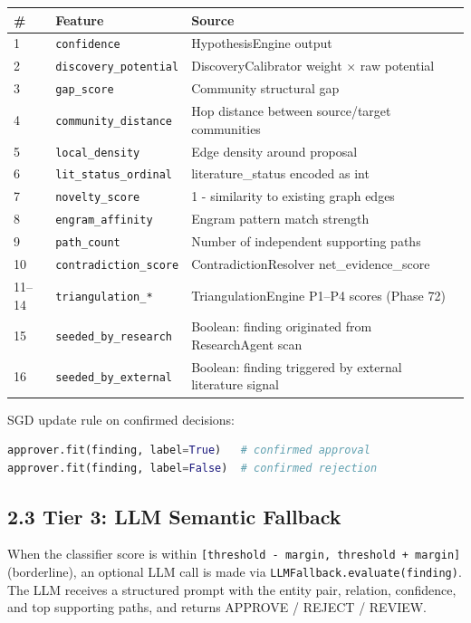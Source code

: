 \begin{table}[h]
\small\centering
\begin{tabular}{lll}
\toprule
# & Feature & Source \\
\midrule
1 & \texttt{confidence} & HypothesisEngine output \\
2 & \texttt{discovery\_potential} & DiscoveryCalibrator weight $\times$ raw potential \\
3 & \texttt{gap\_score} & Community structural gap \\
4 & \texttt{community\_distance} & Hop distance between source/target communities \\
5 & \texttt{local\_density} & Edge density around proposal \\
6 & \texttt{lit\_status\_ordinal} & literature_status encoded as int \\
7 & \texttt{novelty\_score} & 1 - similarity to existing graph edges \\
8 & \texttt{engram\_affinity} & Engram pattern match strength \\
9 & \texttt{path\_count} & Number of independent supporting paths \\
10 & \texttt{contradiction\_score} & ContradictionResolver net_evidence_score \\
11--14 & \texttt{triangulation\_*} & TriangulationEngine P1--P4 scores (Phase 72) \\
15 & \texttt{seeded\_by\_research} & Boolean: finding originated from ResearchAgent scan \\
16 & \texttt{seeded\_by\_external} & Boolean: finding triggered by external literature signal \\
\bottomrule
\end{tabular}
\end{table}


SGD update rule on confirmed decisions:
\begin{lstlisting}[language=Python]
approver.fit(finding, label=True)   # confirmed approval
approver.fit(finding, label=False)  # confirmed rejection
\end{lstlisting}

\subsection*{2.3 Tier 3: LLM Semantic Fallback}

When the classifier score is within \texttt{[threshold - margin, threshold + margin]} (borderline), an optional LLM call is made via \texttt{LLMFallback.evaluate(finding)}. The LLM receives a structured prompt with the entity pair, relation, confidence, and top supporting paths, and returns APPROVE / REJECT / REVIEW.

